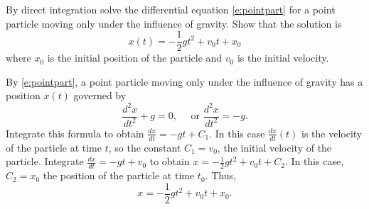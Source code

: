 \documentclass{ximera}
\begin{document}
\begin{exercise} \label{c6.7.2}
By direct integration solve the differential equation \eqref{e:pointpart}
for a point particle moving only under the influence of gravity.  Show
that the solution is
\[
x(t) = -\frac{1}{2}gt^2 + v_0t + x_0
\]
where $x_0$ is the initial position of the particle and $v_0$ is the initial
velocity.

\begin{solution}

By \eqref{e:pointpart}, a point particle moving only under the influence of
gravity has a position $x(t)$ governed by
\[
\frac{d^2x}{dt^2} + g = 0, \quad \mbox{ or } \frac{d^2x}{dt^2} = -g.
\]
Integrate this formula to obtain $\frac{dx}{dt} = -gt + C_1$.  In this case
$\frac{dx}{dt}(t)$ is the velocity of the particle at time $t$, so the
constant $C_1 = v_0$, the initial velocity of the particle.  Integrate
$\frac{dx}{dt} = -gt + v_0$ to obtain
$x = -\frac{1}{2}gt^2 + v_0t + C_2$.  In this case, $C_2 = x_0$ the position
of the particle at time $t_0$.  Thus,
\[
x = -\frac{1}{2}gt^2 + v_0t + x_0.
\]

\end{solution}
\end{exercise}
\end{document}
